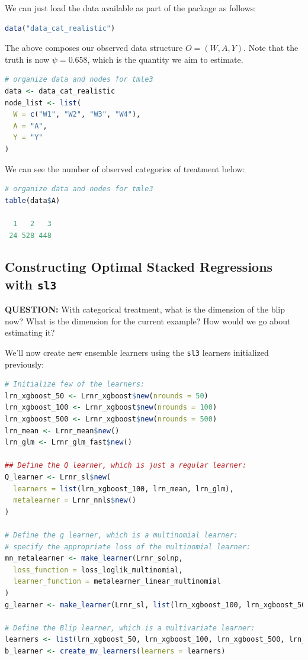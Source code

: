 \documentclass[
  12pt, krantz2,
]{krantz}
\newcommand{\passthrough}[1]{#1}
\theoremstyle{definition}
\theoremstyle{definition}
\theoremstyle{definition}
\newcommand{\1}{\mathbbm{1}}
\begin{document}
We can just load the data available as part of the package as follows:

\begin{lstlisting}[language=R]
data("data_cat_realistic")
\end{lstlisting}

The above composes our observed data structure \(O = (W, A, Y)\). Note that the
truth is now \(\psi=0.658\), which is the quantity we aim to estimate.

\begin{lstlisting}[language=R]
# organize data and nodes for tmle3
data <- data_cat_realistic
node_list <- list(
  W = c("W1", "W2", "W3", "W4"),
  A = "A",
  Y = "Y"
)
\end{lstlisting}

We can see the number of observed categories of treatment below:

\begin{lstlisting}[language=R]
# organize data and nodes for tmle3
table(data$A)

  1   2   3 
 24 528 448 
\end{lstlisting}

\hypertarget{constructing-optimal-stacked-regressions-with-sl3-1}{%
\subsection{\texorpdfstring{Constructing Optimal Stacked Regressions with \texttt{sl3}}{Constructing Optimal Stacked Regressions with sl3}}\label{constructing-optimal-stacked-regressions-with-sl3-1}}

\textbf{QUESTION:} With categorical treatment, what is the dimension of the blip now?
What is the dimension for the current example? How would we go about estimating it?

We'll now create new ensemble learners using the \passthrough{\lstinline!sl3!} learners initialized previously:

\begin{lstlisting}[language=R]
# Initialize few of the learners:
lrn_xgboost_50 <- Lrnr_xgboost$new(nrounds = 50)
lrn_xgboost_100 <- Lrnr_xgboost$new(nrounds = 100)
lrn_xgboost_500 <- Lrnr_xgboost$new(nrounds = 500)
lrn_mean <- Lrnr_mean$new()
lrn_glm <- Lrnr_glm_fast$new()

## Define the Q learner, which is just a regular learner:
Q_learner <- Lrnr_sl$new(
  learners = list(lrn_xgboost_100, lrn_mean, lrn_glm),
  metalearner = Lrnr_nnls$new()
)

# Define the g learner, which is a multinomial learner:
# specify the appropriate loss of the multinomial learner:
mn_metalearner <- make_learner(Lrnr_solnp,
  loss_function = loss_loglik_multinomial,
  learner_function = metalearner_linear_multinomial
)
g_learner <- make_learner(Lrnr_sl, list(lrn_xgboost_100, lrn_xgboost_500, lrn_mean), mn_metalearner)

# Define the Blip learner, which is a multivariate learner:
learners <- list(lrn_xgboost_50, lrn_xgboost_100, lrn_xgboost_500, lrn_mean, lrn_glm)
b_learner <- create_mv_learners(learners = learners)
\end{lstlisting}
\end{document}
